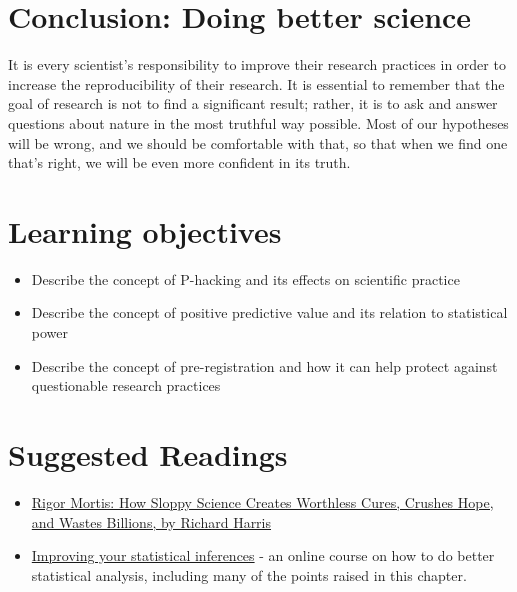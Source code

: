 \documentclass[
  12pt,
]{book}
\providecommand{\tightlist}{%
  \setlength{\itemsep}{0pt}\setlength{\parskip}{0pt}}
\begin{document}
\hypertarget{conclusion-doing-better-science}{%
\section{Conclusion: Doing better science}\label{conclusion-doing-better-science}}

It is every scientist's responsibility to improve their research practices in order to increase the reproducibility of their research. It is essential to remember that the goal of research is not to find a significant result; rather, it is to ask and answer questions about nature in the most truthful way possible. Most of our hypotheses will be wrong, and we should be comfortable with that, so that when we find one that's right, we will be even more confident in its truth.

\hypertarget{learning-objectives-16}{%
\section{Learning objectives}\label{learning-objectives-16}}

\begin{itemize}
\tightlist
\item
  Describe the concept of P-hacking and its effects on scientific practice
\item
  Describe the concept of positive predictive value and its relation to statistical power
\item
  Describe the concept of pre-registration and how it can help protect against questionable research practices
\end{itemize}

\hypertarget{suggested-readings-12}{%
\section{Suggested Readings}\label{suggested-readings-12}}

\begin{itemize}
\tightlist
\item
  \href{https://www.amazon.com/dp/B01K3WN72C}{Rigor Mortis: How Sloppy Science Creates Worthless Cures, Crushes Hope, and Wastes Billions, by Richard Harris}
\item
  \href{https://www.coursera.org/learn/statistical-inferences}{Improving your statistical inferences} - an online course on how to do better statistical analysis, including many of the points raised in this chapter.
\end{itemize}
\end{document}
